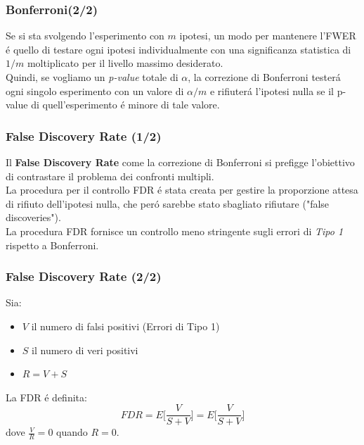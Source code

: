 \documentclass{beamer}
\begin{document}
\begin{frame}
\frametitle{Bonferroni(2/2)}
Se si sta svolgendo l'esperimento con $m$ ipotesi, un modo per mantenere l'FWER \'e quello di testare ogni ipotesi individualmente con una significanza statistica di $1/m$ moltiplicato per il livello massimo desiderato.
\\ \medskip
Quindi, se vogliamo un \emph{p-value} totale di $\alpha$, la correzione di Bonferroni tester\'a ogni singolo esperimento con un valore di $\alpha/m$ e rifiuter\'a l'ipotesi nulla se il p-value di quell'esperimento \'e minore di tale valore.
\end{frame}

\begin{frame}
\frametitle{False Discovery Rate (1/2)}
Il \textbf{False Discovery Rate} come la correzione di Bonferroni si prefigge l'obiettivo di contrastare il problema dei confronti multipli.\\
\smallskip
La procedura per il controllo FDR \'e stata creata per gestire la proporzione attesa di rifiuto dell'ipotesi nulla,  che per\'o sarebbe stato sbagliato rifiutare ("false discoveries").\\
\smallskip
La procedura FDR fornisce un controllo meno stringente sugli errori di \textit{Tipo 1} rispetto a Bonferroni.
\end{frame}

\begin{frame}
\frametitle{False Discovery Rate (2/2)}
Sia:
\begin{itemize}
\item $V$ il numero di falsi positivi (Errori di Tipo 1)
\item $S$ il numero di veri positivi 
\item $R =  V+S$ 
\end{itemize}
La FDR \'e definita:
\begin{equation*}
FDR = E\Big[\frac{V}{S+V}\Big] = E\Big[\frac{V}{S+V}\Big]
\end{equation*}
dove $\frac{V}{R} = 0$ quando $R = 0$.
\end{frame}
\end{document}

